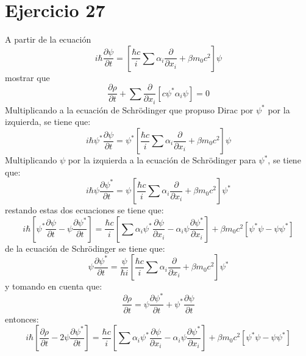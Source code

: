 \section*{Ejercicio 27}
A partir de la ecuación 
\begin{equation*}
    i\hbar \frac{\partial \psi}{\partial t} = \left[ \frac{\hbar c}{i}
    \sum \alpha_i \frac{\partial}{\partial x_i}+\beta m_0c^2\right] \psi
\end{equation*}
mostrar que 
\begin{equation*}
    \frac{\partial \rho}{\partial t} + \sum \frac{\partial}{\partial x_i} \left[c\psi^* \alpha_i \psi \right] = 0
\end{equation*}
Multiplicando a la ecuación de Schr\"odinger que propuso Dirac por $\psi^*$ por la izquierda, se tiene que:
\begin{equation*}
    i\hbar \psi^*\frac{\partial \psi}{\partial t} = \psi^*\left[ \frac{\hbar c}{i}
    \sum \alpha_i \frac{\partial}{\partial x_i}+\beta m_0c^2\right] \psi
\end{equation*}
Multiplicando $\psi$ por la izquierda a la ecuación de Schr\"odinger para $\psi^*$, se tiene que:
\begin{equation*}
    i\hbar \psi\frac{\partial \psi^*}{\partial t} = \psi\left[ \frac{\hbar c}{i}
    \sum \alpha_i \frac{\partial}{\partial x_i}+\beta m_0c^2\right] \psi^*
\end{equation*}
restando estas dos ecuaciones se tiene que:
\begin{equation*}
    i\hbar \left[\psi^* \frac{\partial \psi}{\partial t}- \psi \frac{\partial \psi^*}{\partial t}\right]= \frac{\hbar c}{i} \left[\sum \alpha_i \psi^* \frac{\partial \psi}{\partial x_i}- \alpha_i \psi \frac{\partial \psi^*}{\partial x_i}\right]+ \beta m_0c^2\left[\psi^* \psi - \psi \psi^*\right]
\end{equation*}
de la ecuación de Schr\"odinger se tiene que:
\begin{equation*}
    \psi \frac{\partial \psi^*}{\partial t} =\frac{\psi }{\hbar i }\left[ \frac{\hbar c}{i}
    \sum \alpha_i \frac{\partial}{\partial x_i}+\beta m_0c^2\right] \psi^* 
\end{equation*}
y tomando en cuenta que:
\begin{equation*}
    \frac{\partial \rho}{\partial t} = \psi \frac{\partial \psi^*}{\partial t} +  \psi^* \frac{\partial \psi}{\partial t}
\end{equation*}
entonces:
\begin{equation*}
    i\hbar \left[\frac{\partial \rho}{\partial t} -2 \psi \frac{\partial \psi^*}{\partial t} \right] = \frac{\hbar c}{i} \left[\sum \alpha_i \psi^* \frac{\partial \psi}{\partial x_i}- \alpha_i \psi \frac{\partial \psi^*}{\partial x_i}\right]+ \beta m_0c^2\left[\psi^* \psi - \psi \psi^*\right]
\end{equation*}
